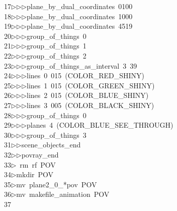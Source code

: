 \begin{tabbing}
17\>$\triangleright$\>$\triangleright$\>$\triangleright$\>plane\_by\_dual\_coordinates\ 0100\ \\[0pt]
18\>$\triangleright$\>$\triangleright$\>$\triangleright$\>plane\_by\_dual\_coordinates\ 1000\ \\[0pt]
19\>$\triangleright$\>$\triangleright$\>$\triangleright$\>plane\_by\_dual\_coordinates\ 4519\ \\[0pt]
20\>$\triangleright$\>$\triangleright$\>$\triangleright$\>group\_of\_things\ 0\ \\[0pt]
21\>$\triangleright$\>$\triangleright$\>$\triangleright$\>group\_of\_things\ 1\ \\[0pt]
22\>$\triangleright$\>$\triangleright$\>$\triangleright$\>group\_of\_things\ 2\ \\[0pt]
23\>$\triangleright$\>$\triangleright$\>$\triangleright$\>group\_of\_things\_as\_interval\ 3\ 39\ \\[0pt]
24\>$\triangleright$\>$\triangleright$\>$\triangleright$\>lines\ 0\ 015\ (COLOR\_RED\_SHINY)\ \\[0pt]
25\>$\triangleright$\>$\triangleright$\>$\triangleright$\>lines\ 1\ 015\ (COLOR\_GREEN\_SHINY)\ \\[0pt]
26\>$\triangleright$\>$\triangleright$\>$\triangleright$\>lines\ 2\ 015\ (COLOR\_BLUE\_SHINY)\ \\[0pt]
27\>$\triangleright$\>$\triangleright$\>$\triangleright$\>lines\ 3\ 005\ (COLOR\_BLACK\_SHINY)\ \\[0pt]
28\>$\triangleright$\>$\triangleright$\>$\triangleright$\>group\_of\_things\ 0\ \\[0pt]
29\>$\triangleright$\>$\triangleright$\>$\triangleright$\>planes\ 4\ (COLOR\_BLUE\_SEE\_THROUGH)\ \\[0pt]
30\>$\triangleright$\>$\triangleright$\>$\triangleright$\>group\_of\_things\ 3\ \\[0pt]
31\>$\triangleright$\>$\triangleright$\>scene\_objects\_end\ \\[0pt]
32\>$\triangleright$\>$\triangleright$\>povray\_end\\[0pt]
33\>$\triangleright$\>\ rm\ rf\ POV\\[0pt]
34\>$\triangleright$\>mkdir\ POV\\[0pt]
35\>$\triangleright$\>mv\ plane2\_0\_*pov\ POV\\[0pt]
36\>$\triangleright$\>mv\ makefile\_animation\ POV\\[0pt]
37\>\end{tabbing}
